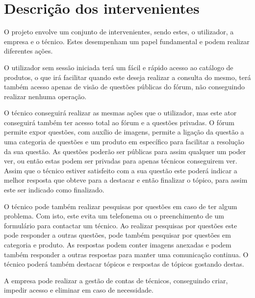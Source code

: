 \section{Descrição dos intervenientes}
O projeto envolve um conjunto de intervenientes, sendo estes, o utilizador, a empresa e o técnico. 
Estes desempenham um papel fundamental e podem realizar diferentes ações.

O utilizador sem sessão iniciada terá um fácil e rápido acesso ao catálogo de produtos, o que irá 
facilitar quando este deseja realizar a consulta do mesmo, terá também acesso apenas de visão de questões 
públicas do fórum, não conseguindo realizar nenhuma operação.

O técnico conseguirá realizar as mesmas ações que o utilizador, mas este ator conseguirá também ter 
acesso total ao fórum e a questões privadas. O fórum permite expor questões, com auxílio de imagens, 
permite a ligação da 
questão a uma categoria de questões e um produto em específico para facilitar a resolução da sua questão. 
As questões poderão ser públicas para assim qualquer um poder ver, ou então estas podem ser 
privadas para apenas técnicos conseguirem ver. Assim que o técnico estiver satisfeito com a sua 
questão este poderá indicar a melhor resposta que obteve para a destacar e então finalizar o tópico, 
para assim este ser indicado como finalizado.

O técnico pode também realizar pesquisas por questões em caso de ter algum problema. Com isto, este 
evita um telefonema ou o preenchimento de um formulário para contactar um técnico. Ao realizar pesquisas 
por questões este pode responder a outras questões, pode também pesquisar por questões em categoria 
e produto. As respostas podem conter imagens anexadas e podem também responder a outras 
respostas para manter uma comunicação continua. O técnico poderá também destacar tópicos e respostas de 
tópicos gostando destas.

A empresa pode realizar a gestão de contas de técnicos, conseguindo criar, impedir acesso e 
eliminar em caso de necessidade.
